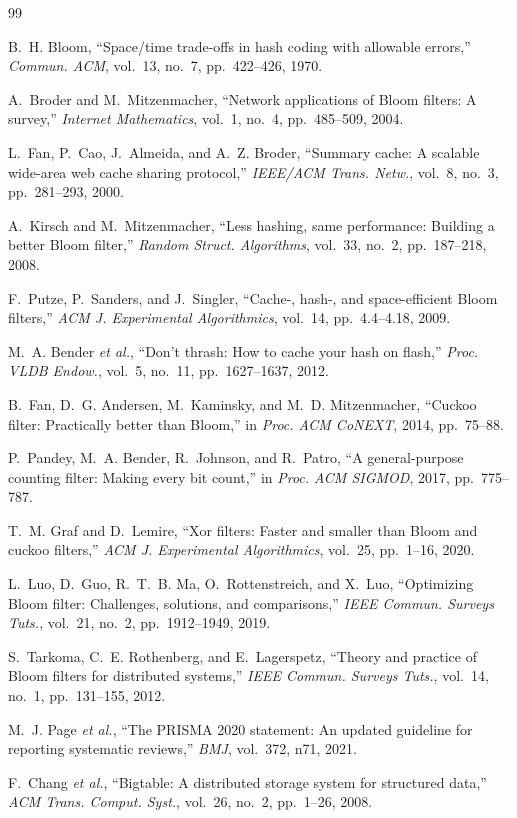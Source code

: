 \documentclass[conference]{IEEEtran}
\begin{document}
\begin{thebibliography}{99}
\footnotesize

 B.~H. Bloom, ``Space/time trade-offs in hash coding with
allowable errors,'' \emph{Commun. ACM}, vol.~13, no.~7, pp.~422--426, 1970.

 A.~Broder and M.~Mitzenmacher, ``Network
applications of Bloom filters: A survey,'' \emph{Internet Mathematics}, vol.~1,
no.~4, pp.~485--509, 2004.

 L.~Fan, P.~Cao, J.~Almeida, and A.~Z. Broder,
``Summary cache: A scalable wide-area web cache sharing protocol,'' \emph{IEEE/ACM
Trans. Netw.}, vol.~8, no.~3, pp.~281--293, 2000.

 A.~Kirsch and M.~Mitzenmacher, ``Less hashing, same
performance: Building a better Bloom filter,'' \emph{Random Struct. Algorithms},
vol.~33, no.~2, pp.~187--218, 2008.

 F.~Putze, P.~Sanders, and J.~Singler, ``Cache-, hash-,
and space-efficient Bloom filters,'' \emph{ACM J. Experimental Algorithmics},
vol.~14, pp.~4.4--4.18, 2009.

 M.~A. Bender \emph{et al.}, ``Don't thrash: How to
cache your hash on flash,'' \emph{Proc. VLDB Endow.}, vol.~5, no.~11,
pp.~1627--1637, 2012.

 B.~Fan, D.~G. Andersen, M.~Kaminsky, and M.~D.
Mitzenmacher, ``Cuckoo filter: Practically better than Bloom,'' in \emph{Proc.
ACM CoNEXT}, 2014, pp.~75--88.

 P.~Pandey, M.~A. Bender, R.~Johnson, and R.~Patro,
``A general-purpose counting filter: Making every bit count,'' in \emph{Proc.
ACM SIGMOD}, 2017, pp.~775--787.

 T.~M. Graf and D.~Lemire, ``Xor filters: Faster and
smaller than Bloom and cuckoo filters,'' \emph{ACM J. Experimental
Algorithmics}, vol.~25, pp.~1--16, 2020.

 L.~Luo, D.~Guo, R.~T.~B. Ma, O.~Rottenstreich, and
X.~Luo, ``Optimizing Bloom filter: Challenges, solutions, and comparisons,''
\emph{IEEE Commun. Surveys Tuts.}, vol.~21, no.~2, pp.~1912--1949, 2019.

 S.~Tarkoma, C.~E. Rothenberg, and E.~Lagerspetz,
``Theory and practice of Bloom filters for distributed systems,'' \emph{IEEE
Commun. Surveys Tuts.}, vol.~14, no.~1, pp.~131--155, 2012.

 M.~J. Page \emph{et al.}, ``The PRISMA 2020 statement:
An updated guideline for reporting systematic reviews,'' \emph{BMJ}, vol.~372,
n71, 2021.

 F.~Chang \emph{et al.}, ``Bigtable: A distributed
storage system for structured data,'' \emph{ACM Trans. Comput. Syst.}, vol.~26,
no.~2, pp.~1--26, 2008.

\end{thebibliography}
\end{document}
